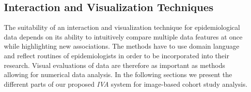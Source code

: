 \documentclass[journal]{style/vgtc} 			          %
\begin{document}
\subsection{Interaction and Visualization Techniques} \label{Interaction- and Visualization Techniques}
%
%
The suitability of an interaction and visualization technique for epidemiological data depends on its ability to intuitively compare multiple data features at once while highlighting new associations.
%
%
The methods have to use domain language and reflect routines of epidemiologists in order to be incorporated into their research.
%
Visual evaluations of data are therefore as important as methods allowing for numerical data analysis.
%
In the following sections we present the different parts of our proposed \emph{IVA} system for image-based cohort study analysis.
\end{document}
